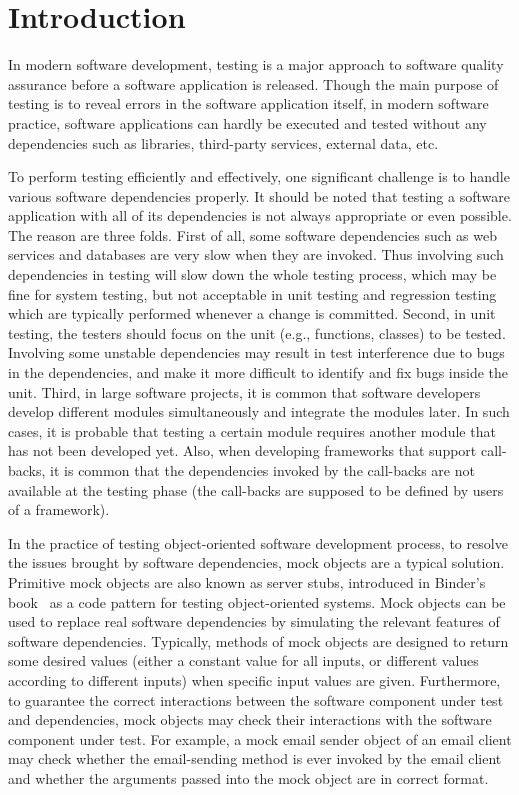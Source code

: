 \section{Introduction}
\label{sec:intro}

In modern software development, testing is a major approach to software quality assurance before a software application is released. Though the main purpose of testing is to reveal errors in the software application itself, in modern software practice, software applications can hardly be executed and tested without any dependencies such as libraries, third-party services, external data, etc. 

To perform testing efficiently and effectively, one significant challenge is to handle various software dependencies properly. It should be noted that testing a software application with all of its dependencies is not always appropriate or even possible. The reason are three folds. First of all, some software dependencies such as web services and databases are very slow when they are invoked. Thus involving such dependencies in testing will slow down the whole testing process, which may be fine for system testing, but not acceptable in unit testing and regression testing which are typically performed whenever a change is committed. Second, in unit testing, the testers should focus on the unit (e.g., functions, classes) to be tested. Involving some unstable dependencies may result in test interference due to bugs in the dependencies, and make it more difficult to identify and fix bugs inside the unit. Third, in large software projects, it is common that software developers develop different modules simultaneously and integrate the modules later. In such cases, it is probable that testing a certain module requires another module that has not been developed yet. Also, when developing frameworks that support call-backs, it is common that the dependencies invoked by the call-backs are not available at the testing phase (the call-backs are supposed to be defined by users of a framework). 

In the practice of testing object-oriented software development process, to resolve the issues brought by software dependencies, mock objects are a typical solution. Primitive mock objects are also known as server stubs, introduced in Binder's book~\cite{} as a code pattern for testing object-oriented systems. Mock objects can be used to replace real software dependencies by simulating the relevant features of software dependencies. Typically, methods of mock objects are designed to return some desired values (either a constant value for all inputs, or different values according to different inputs) when specific input values are given. Furthermore, to guarantee the correct interactions between the software component under test and dependencies, mock objects may check their interactions with the software component under test. For example, a mock email sender object of an email client may check whether the email-sending method is ever invoked by the email client and whether the arguments passed into the mock object are in correct format. 

